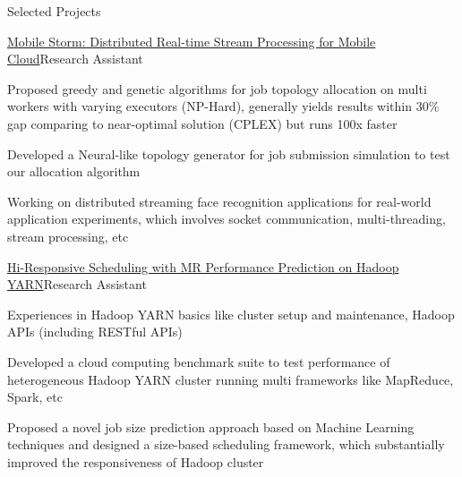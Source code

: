 \documentclass{resume} %
\begin{document}
\begin{rSection}{Selected Projects}
\begin{rSubsection}{\href{http://ieeexplore.ieee.org/document/7335296/?arnumber=7335296}{Mobile Storm: Distributed Real-time Stream Processing for Mobile Cloud}}{Research Assistant}{}{}
\item Proposed greedy and genetic algorithms for job topology allocation on multi workers with varying executors (NP-Hard), generally yields results within $30\%$ gap comparing to near-optimal solution (CPLEX) but runs 100x faster
\item Developed a Neural-like topology generator for job submission simulation to test our allocation algorithm
\item Working on distributed streaming face recognition applications for real-world application experiments, which involves socket communication, multi-threading, stream processing, etc

\end{rSubsection}

\begin{rSubsection}{\href{http://ieeexplore.ieee.org/document/7579961/}{Hi-Responsive Scheduling with MR Performance Prediction on Hadoop YARN}}{Research Assistant}{}{}
\item Experiences in Hadoop YARN basics like cluster setup and maintenance, Hadoop APIs (including RESTful APIs)
\item Developed a cloud computing benchmark suite to test performance of heterogeneous Hadoop YARN cluster running multi frameworks like MapReduce, Spark, etc
\item Proposed a novel job size prediction approach based on Machine Learning techniques and designed a size-based scheduling framework, which substantially improved the responsiveness of Hadoop cluster

\end{rSubsection}





\end{rSection}
\end{document}
